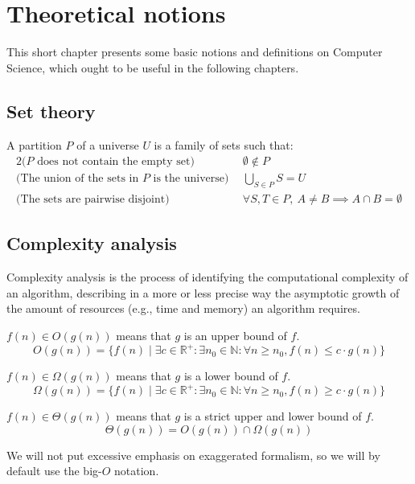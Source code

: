 \chapter{Theoretical notions} \label{theoretical-notions}
This short chapter presents some basic notions and definitions on Computer Science, which ought to be useful in the following chapters.
\section{Set theory} \label{set-theory}
\begin{definition}[Partition]
    A partition $P$ of a universe $U$ is a family of sets such that:
    \begin{alignat*}{2}
        \text{($P$ does not contain the empty set)}          ~~& \emptyset \not \in P\\
        \text{(The union of the sets in $P$ is the universe)}~~& \bigcup_{S \in P}{S} = U\\
        \text{(The sets are pairwise disjoint)}              ~~& \forall S, T \in P,~A \neq B \implies A \cap B = \emptyset
    \end{alignat*}
\end{definition}
\section{Complexity analysis} \label{complexity-analysis}
Complexity analysis is the process of identifying the computational complexity of an algorithm, describing in a more or less precise way the asymptotic growth of the amount of resources (e.g., time and memory) an algorithm requires.
\begin{definition} $f(n) \in O(g(n))$ means that $g$ is an upper bound of $f$.
    \begin{equation*}
        O(g(n))=\{f(n) \mid \exists c \in \mathbb{R}^+ \colon \exists n_0 \in \mathbb{N} \colon \forall n \geq n_0, f(n) \leq c\cdot g(n)\}
    \end{equation*}
\end{definition}
\begin{definition} $f(n) \in \Omega(g(n))$ means that $g$ is a lower bound of $f$.
    \begin{equation*}
        \Omega(g(n))=\{f(n) \mid \exists c \in \mathbb{R}^+ \colon \exists n_0 \in \mathbb{N} \colon \forall n \geq n_0, f(n) \geq c\cdot g(n)\}
    \end{equation*}
\end{definition}
\begin{definition} $f(n) \in \Theta(g(n))$ means that $g$ is a strict upper and lower bound of $f$.
    \begin{equation*}
        \Theta(g(n))=O(g(n)) \cap \Omega(g(n))
    \end{equation*}
\end{definition}
We will not put excessive emphasis on exaggerated formalism, so we will by default use the big-$O$ notation.
